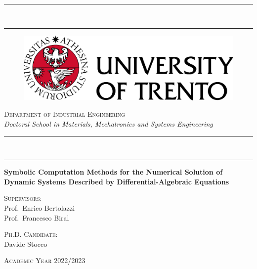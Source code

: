 
\begin{titlepage}
%
\setlength\parindent{0pt}
\setlength{\topmargin}{-20mm}
\setlength{\voffset}{0mm}
%
\begin{center}
  \rule[0.1cm]{\textwidth}{0.6mm} \\ %
  \rule[0.5cm]{\textwidth}{0.3mm}
\end{center}
%
\vspace{-5mm}
%
\begin{figure}[htb]
  \centering
  \includegraphics[scale=0.5]{./figures/frontmatter/logo.png}
\end{figure}
%
\begin{center}
  \Large{\textsc{Department of Industrial Engineering}} \\
  \vspace{2mm}
  \large{\textsl{Doctoral School in Materials, Mechatronics and Systems Engineering}} \\
\end{center}
%
\begin{center}
  \rule[0.1cm]{\textwidth}{0.3mm} \\ %
  \rule[0.5cm]{\textwidth}{0.6mm}
\end{center}
%
\vfill
%
\begin{center}
  \huge{\textbf{Symbolic Computation Methods for the Numerical Solution of Dynamic Systems Described by Differential-Algebraic Equations}} \\
\end{center}
%
\vfill
%
\begin{minipage}[t]{0.49\textwidth}
  \Large{\textsc{Supervisors:}} \\
  Prof.~Enrico Bertolazzi \\[0.05em]
  Prof.~Francesco Biral
\end{minipage}
\hfill
\begin{minipage}[t]{0.49\textwidth}\raggedleft
  \Large{\textsc{Ph.D. Candidate:}} \\
  Davide Stocco
  \vspace{5mm}
\end{minipage}
%
\vfill
%
\begin{center}
  \large{\textsc{Academic Year 2022/2023}}
\end{center}

\end{titlepage}